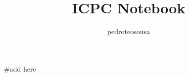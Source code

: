\documentclass{article}
\title{ICPC Notebook}
\author{pedroteosousa }
\date{}
\begin{document}

\maketitle
\tableofcontents

#add here

\end{document}

